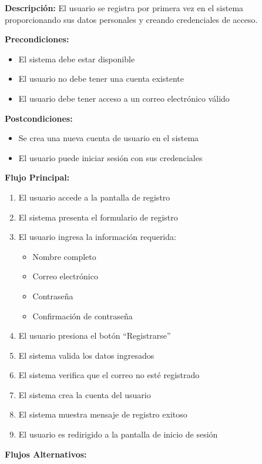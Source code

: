 \noindent\textbf{Descripción:} El usuario se registra por primera vez en el sistema proporcionando sus datos personales y creando credenciales de acceso.

\noindent\textbf{Precondiciones:}
\begin{itemize}
    \item El sistema debe estar disponible
    \item El usuario no debe tener una cuenta existente
    \item El usuario debe tener acceso a un correo electrónico válido
\end{itemize}

\noindent\textbf{Postcondiciones:}
\begin{itemize}
    \item Se crea una nueva cuenta de usuario en el sistema
    \item El usuario puede iniciar sesión con sus credenciales
\end{itemize}

\noindent\textbf{Flujo Principal:}
\begin{enumerate}
    \item El usuario accede a la pantalla de registro
    \item El sistema presenta el formulario de registro
    \item El usuario ingresa la información requerida:
    \begin{itemize}
        \item Nombre completo
        \item Correo electrónico
        \item Contraseña
        \item Confirmación de contraseña
    \end{itemize}
    \item El usuario presiona el botón ``Registrarse''
    \item El sistema valida los datos ingresados
    \item El sistema verifica que el correo no esté registrado
    \item El sistema crea la cuenta del usuario
    \item El sistema muestra mensaje de registro exitoso
    \item El usuario es redirigido a la pantalla de inicio de sesión
\end{enumerate}

\noindent\textbf{Flujos Alternativos:}

